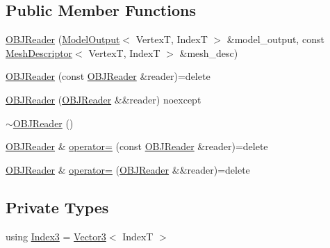 \subsection*{Public Member Functions}
\begin{DoxyCompactItemize}
\item 
\hyperlink{classmage_1_1loader_1_1_o_b_j_reader_ac0e4964f2898f4eec0212c6c292825c0}{O\+B\+J\+Reader} (\hyperlink{structmage_1_1_model_output}{Model\+Output}$<$ VertexT, IndexT $>$ \&model\+\_\+output, const \hyperlink{classmage_1_1_mesh_descriptor}{Mesh\+Descriptor}$<$ VertexT, IndexT $>$ \&mesh\+\_\+desc)
\item 
\hyperlink{classmage_1_1loader_1_1_o_b_j_reader_a078557b2ea85ea5dfc4d6926d1ff266d}{O\+B\+J\+Reader} (const \hyperlink{classmage_1_1loader_1_1_o_b_j_reader}{O\+B\+J\+Reader} \&reader)=delete
\item 
\hyperlink{classmage_1_1loader_1_1_o_b_j_reader_a95867e96602f85c6c23f490635530c00}{O\+B\+J\+Reader} (\hyperlink{classmage_1_1loader_1_1_o_b_j_reader}{O\+B\+J\+Reader} \&\&reader) noexcept
\item 
\hyperlink{classmage_1_1loader_1_1_o_b_j_reader_a632f50cdf9e91ce2c1226b583ef6fde6}{$\sim$\+O\+B\+J\+Reader} ()
\item 
\hyperlink{classmage_1_1loader_1_1_o_b_j_reader}{O\+B\+J\+Reader} \& \hyperlink{classmage_1_1loader_1_1_o_b_j_reader_a83f3553355ca35eada2267caebd6cbca}{operator=} (const \hyperlink{classmage_1_1loader_1_1_o_b_j_reader}{O\+B\+J\+Reader} \&reader)=delete
\item 
\hyperlink{classmage_1_1loader_1_1_o_b_j_reader}{O\+B\+J\+Reader} \& \hyperlink{classmage_1_1loader_1_1_o_b_j_reader_a0dc19f003490ad91b6ed9ee8365e3bd4}{operator=} (\hyperlink{classmage_1_1loader_1_1_o_b_j_reader}{O\+B\+J\+Reader} \&\&reader)=delete
\end{DoxyCompactItemize}
\subsection*{Private Types}
\begin{DoxyCompactItemize}
\item 
using \hyperlink{classmage_1_1loader_1_1_o_b_j_reader_af9aab131e88c5a3a0f29b156c4c97096}{Index3} = \hyperlink{structmage_1_1_vector3}{Vector3}$<$ IndexT $>$
\end{DoxyCompactItemize}
